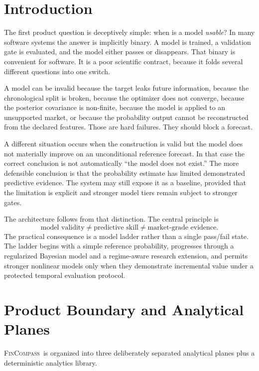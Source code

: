 \documentclass[11pt]{article}
\newcommand{\FC}{\textsc{FinCompass}}
\begin{document}
\section{Introduction}
The first product question is deceptively simple: when is a model \emph{usable}? In many software systems the answer is implicitly binary. A model is trained, a validation gate is evaluated, and the model either passes or disappears. That binary is convenient for software. It is a poor scientific contract, because it folds several different questions into one switch.

A model can be invalid because the target leaks future information, because the chronological split is broken, because the optimizer does not converge, because the posterior covariance is non-finite, because the model is applied to an unsupported market, or because the probability output cannot be reconstructed from the declared features. Those are hard failures. They should block a forecast.

A different situation occurs when the construction is valid but the model does not materially improve on an unconditional reference forecast. In that case the correct conclusion is not automatically ``the model does not exist.'' The more defensible conclusion is that the probability estimate has limited demonstrated predictive evidence. The system may still expose it as a baseline, provided that the limitation is explicit and stronger model tiers remain subject to stronger gates.

The architecture follows from that distinction. The central principle is
\begin{equation}
\text{model validity}\neq\text{predictive skill}\neq\text{market-grade evidence}.
\end{equation}
The practical consequence is a model ladder rather than a single pass/fail state. The ladder begins with a simple reference probability, progresses through a regularized Bayesian model and a regime-aware research extension, and permits stronger nonlinear models only when they demonstrate incremental value under a protected temporal evaluation protocol.

\section{Product Boundary and Analytical Planes}
\FC\ is organized into three deliberately separated analytical planes plus a deterministic analytics library.
\end{document}
